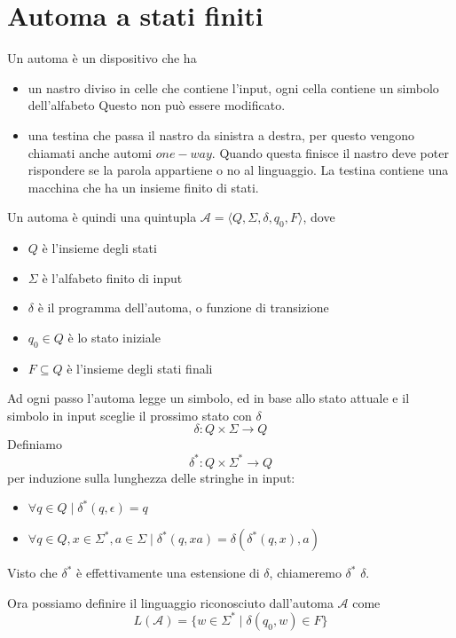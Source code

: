 \documentclass[12pt]{article}
\begin{document}
\section{Automa a stati finiti}
Un automa è un dispositivo che ha
\begin{itemize}
	\item un nastro diviso in celle che contiene l'input, ogni cella contiene un simbolo dell'alfabeto
		Questo non può essere modificato.
	\item una testina che passa il nastro da sinistra a destra, per questo vengono chiamati anche automi $one-way$.
		Quando questa finisce il nastro deve poter rispondere se la parola appartiene o no al linguaggio.
		La testina contiene una macchina che ha un insieme finito di stati.
\end{itemize}
Un automa è quindi una quintupla $\mathscr{A} = \langle Q, \Sigma, \delta, q_0, F \rangle$, dove
\begin{itemize}
	\item $Q$ è l'insieme degli stati
	\item $\Sigma$ è l'alfabeto finito di input
	\item $\delta$ è il programma dell'automa, o funzione di transizione
	\item $q_0 \in Q$ è lo stato iniziale
	\item $F \subseteq Q$ è l'insieme degli stati finali
\end{itemize}
Ad ogni passo l'automa legge un simbolo, ed in base allo stato attuale e il simbolo in input sceglie il prossimo stato con $\delta$
$$ \delta : Q \times \Sigma \rightarrow Q $$
Definiamo 
$$ \delta^* : Q \times \Sigma^* \rightarrow Q $$
per induzione sulla lunghezza delle stringhe in input:
\begin{itemize}
	\item $\forall q \in Q \mid \delta^*(q, \epsilon) = q $
	\item $\forall q \in Q, x \in \Sigma^*, a \in \Sigma \mid \delta^*(q, x a) = \delta(\delta^*(q, x), a)$
\end{itemize}
Visto che $\delta^*$ è effettivamente una estensione di $\delta$, chiameremo $\delta^*$ $\delta$.

Ora possiamo definire il linguaggio riconosciuto dall'automa $\mathscr{A}$ come
$$ L(\mathscr{A}) = \{ w \in \Sigma^* \mid \delta(q_0, w) \in F \} $$
\end{document}
